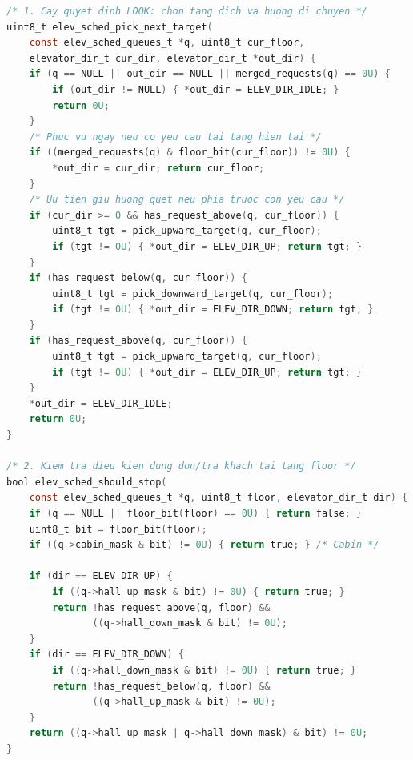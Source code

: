 \begin{lstlisting}[language=C, caption={Cây quyết định chọn tầng đích LOOK và quy tắc dừng O(1) trong elevator\_scheduler.c}]
/* 1. Cay quyet dinh LOOK: chon tang dich va huong di chuyen */
uint8_t elev_sched_pick_next_target(
    const elev_sched_queues_t *q, uint8_t cur_floor,
    elevator_dir_t cur_dir, elevator_dir_t *out_dir) {
    if (q == NULL || out_dir == NULL || merged_requests(q) == 0U) {
        if (out_dir != NULL) { *out_dir = ELEV_DIR_IDLE; }
        return 0U;
    }
    /* Phuc vu ngay neu co yeu cau tai tang hien tai */
    if ((merged_requests(q) & floor_bit(cur_floor)) != 0U) {
        *out_dir = cur_dir; return cur_floor;
    }
    /* Uu tien giu huong quet neu phia truoc con yeu cau */
    if (cur_dir >= 0 && has_request_above(q, cur_floor)) {
        uint8_t tgt = pick_upward_target(q, cur_floor);
        if (tgt != 0U) { *out_dir = ELEV_DIR_UP; return tgt; }
    }
    if (has_request_below(q, cur_floor)) {
        uint8_t tgt = pick_downward_target(q, cur_floor);
        if (tgt != 0U) { *out_dir = ELEV_DIR_DOWN; return tgt; }
    }
    if (has_request_above(q, cur_floor)) {
        uint8_t tgt = pick_upward_target(q, cur_floor);
        if (tgt != 0U) { *out_dir = ELEV_DIR_UP; return tgt; }
    }
    *out_dir = ELEV_DIR_IDLE;
    return 0U;
}

/* 2. Kiem tra dieu kien dung don/tra khach tai tang floor */
bool elev_sched_should_stop(
    const elev_sched_queues_t *q, uint8_t floor, elevator_dir_t dir) {
    if (q == NULL || floor_bit(floor) == 0U) { return false; }
    uint8_t bit = floor_bit(floor);
    if ((q->cabin_mask & bit) != 0U) { return true; } /* Cabin */

    if (dir == ELEV_DIR_UP) {
        if ((q->hall_up_mask & bit) != 0U) { return true; }
        return !has_request_above(q, floor) &&
               ((q->hall_down_mask & bit) != 0U);
    }
    if (dir == ELEV_DIR_DOWN) {
        if ((q->hall_down_mask & bit) != 0U) { return true; }
        return !has_request_below(q, floor) &&
               ((q->hall_up_mask & bit) != 0U);
    }
    return ((q->hall_up_mask | q->hall_down_mask) & bit) != 0U;
}
\end{lstlisting}

